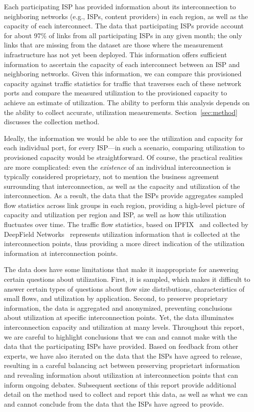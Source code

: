 Each participating ISP has provided information about its interconnection to
neighboring networks (e.g., ISPs, content providers) in each region, as well as the capacity of each interconnect.
The data that participating ISPs provide account for about 97\% of links
from all participating ISPs in any given month; the only links that are
missing from the dataset are those where the measurement infrastructure
has not yet been deployed.  This information offers sufficient
information to ascertain the capacity of each interconnect between an
ISP and neighboring networks. Given this information, we can compare
this provisioned capacity against traffic statistics for traffic that
traverses each of these network ports and compare the measured
utilization to the provisioned capacity to achieve an estimate of
utilization. The ability to perform this analysis depends on the ability
to collect accurate, utilization measurements. Section~\ref{sec:method}
discusses the collection method.

Ideally, the information we would be able to see the utilization
and capacity for each individual port, for every ISP---in such a
scenario, comparing utilization to provisioned capacity would be
straightforward. Of course, the practical realities are more
complicated: even the {\em existence} of an individual interconnection is
typically considered proprietary, not to mention the business agreement
surrounding that interconnection, as well as the capacity and
utilization of the interconnection. As a result, the data that the ISPs
provide aggregates sampled flow statistics across link groups 
in each region, providing a high-level picture of capacity and
utilization per region and ISP, as well as how this utilization
fluctuates over time. The traffic
flow statistics, based on IPFIX~\cite{rfc7011} and
collected by DeepField Networks~\cite{www-deepfield} represents
utilization information that is collected at the interconnection points,
thus providing a more direct indication of the utilization information
at interconnection points.

The data does have some limitations that make it inappropriate for
answering certain questions about utilization. First, it is sampled,
which makes it difficult to answer certain types of questions about flow
size distributions, characteristics of small flows, and utilization by
application.  Second, to preserve proprietary information, the data is
aggregated and anonymized, preventing conclusions about utilization at
specific interconnection points. Yet, the data illuminates
interconnection capacity and utilization at many levels. Throughout this
report, we are careful to highlight conclusions that we can and cannot
make with the data that the participating ISPs have
provided. Based on feedback from other experts, we have also iterated on
the data that the ISPs have agreed to release, resulting in a careful
balancing act between preserving proprietart information and revealing
information about utilization at interconnection 
points that can inform ongoing debates. 
Subsequent sections of this
report provide additional detail on the method used to collect and
report this data, as well as what we can and cannot conclude from the
data that the ISPs have agreed to provide. 


